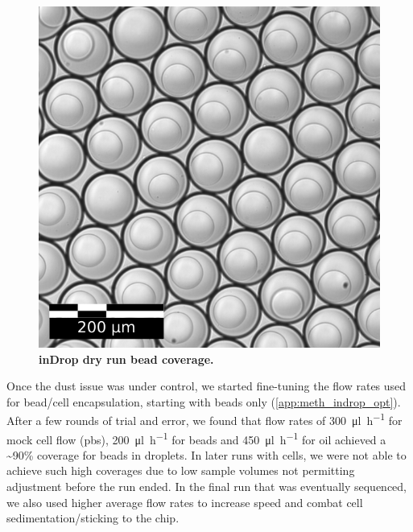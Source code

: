 \begin{figure}
\vspace{-15pt}
\centering
\includegraphics[width=\textwidth/3]{./ims/indrop_coverage.png}
\caption[inDrop dry run bead coverage]{\textbf{inDrop dry run bead coverage.}}
\label{fig:indrop_coverage}
\vspace{-20pt}
\end{figure}

Once the dust issue was under control, we started fine-tuning the flow rates used for bead/cell encapsulation, starting with beads only (\ref{app:meth_indrop_opt}). After a few rounds of trial and error, we found that flow rates of \SI{300}{\ul\per\hour} for mock cell flow (\acrshort{pbs}), \SI{200}{\ul\per\hour} for beads and \SI{450}{\ul\per\hour} for oil achieved a \textasciitilde{90}\% coverage for beads in droplets. In later runs with cells, we were not able to achieve such high coverages due to low sample volumes not permitting adjustment before the run ended. In the final run that was eventually sequenced, we also used higher average flow rates to increase speed and combat cell sedimentation/sticking to the chip.\pms

